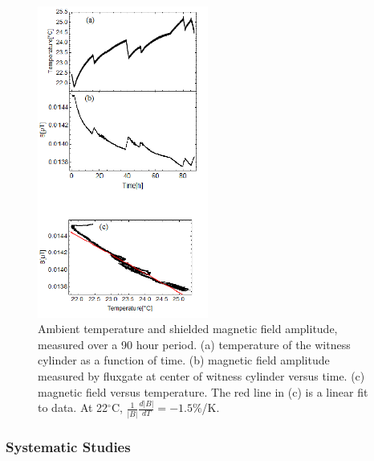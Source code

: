 \begin{figure}
\begin{center}
   \includegraphics[width=0.5\textwidth]{B_vs_T.png}
    \caption{Ambient temperature and shielded magnetic field
      amplitude, measured over a 90 hour period. (a) temperature of
      the witness cylinder as a function of time.  (b) magnetic field
      amplitude measured by fluxgate at center of witness cylinder
      versus time.  (c) magnetic field versus temperature. The red
      line in (c) is a linear fit to data. At 22$^\circ$C,
      $\frac{1}{|B|}\frac{d|B|}{dT}=-1.5\%$/K.}
    \label{fig:B_vs_Temp}
    \end{center}
\end{figure} 

%


\subsubsection{Systematic Studies\label{sec:axialsyst}}

